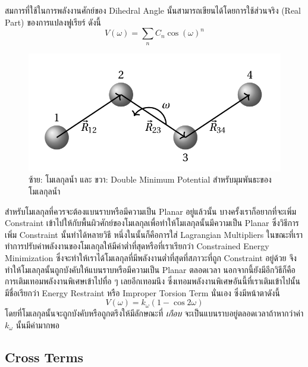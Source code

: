 สมการที่ใช้ในการพลังงานศักย์ของ Dihedral Angle นั้นสามารถเขียนได้โดยการใช้ส่วนจริง (Real Part) ของการแปลงฟูเรียร์ ดังนี้
%
\begin{equation}
  V(\omega)
  =
  \sum_{n} C_{n} \cos(\omega)^{n}
\end{equation}

\begin{figure}[H]
  \centering
  \includegraphics[width=0.8\linewidth]{fig/dihedral-angle.png}
  \caption{ซ้าย: โมเลกุลน้ำ และ ขวา: Double Minimum Potential สำหรับมุมพันธะของโมเลกุลน้ำ}
  \label{fig:dihedral_angle}
\end{figure}

สำหรับโมเลกุลที่ควรจะต้องแบนราบหรือมีความเป็น Planar อยู่แล้วนั้น บางครั้งเราก็อยากที่จะเพิ่ม Constraint เข้าไปให้กับพื้นผิวศักย์ของโมเลกุลเพื่อทำให้โมเลกุลนั้นมีความเป็น Planar ซึ่งวิธีการเพิ่ม Constraint นั้นทำได้หลายวิธี หนึ่งในนั้นก็คือการใส่ Lagrangian Multipliers ในขณะที่เราทำการปรับค่าพลังงานของโมเลกุลให้มีค่าต่ำที่สุดหรือที่เราเรียกว่า Constrained Energy Minimization ซึ่งจะทำให้เราได้โมเลกุลที่มีพลังงานต่ำที่สุดที่สภาวะที่ถูก Constraint อยู่ด้วย จึงทำให้โมเลกุลนั้นถูกบังคับให้แบนราบหรือมีความเป็น Planar ตลอดเวลา นอกจากนี้ยังมีอีกวิธีก็คือการเติมเทอมพลังงานพิเศษเข้าไปทื่อ ๆ เลยอีกเทอมนึง ซึ่งเทอมพลังงานพิเศษอันนี้ที่เราเติมเข้าไปนั้นมีชื่อเรียกว่า Energy Restraint หรือ Improper Torsion Term นั่นเอง ซึ่งมีหน้าตาดังนี้
%
\begin{equation}
  V(\omega)
  =
  k_{\omega}
  (1 - \cos 2\omega)
\end{equation}
%
โดยที่โมเลกุลนั้นจะถูกบังคับหรือถูกตรึงให้มีลักษณะที่ \textit{เกือบ} จะเป็นแบนราบอยู่ตลอดเวลาถ้าหากว่าค่า $k_{\omega}$ นั้นมีค่ามากพอ

\subsection{Cross Terms}

